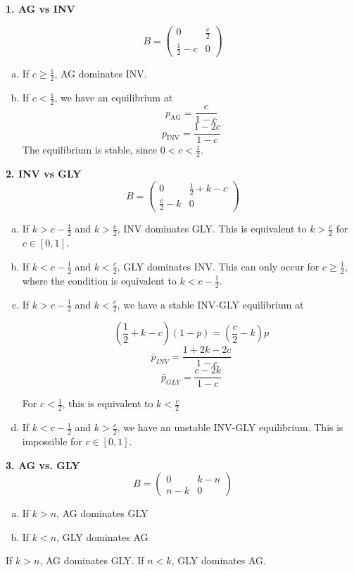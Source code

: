 \documentclass[12pt]{report}
\begin{document}
\textbf{1. AG vs INV} 

$$B = \begin{pmatrix}
0 & \frac{c}{2}\\
\frac{1}{2} - c & 0 
\end{pmatrix} $$

\begin{enumerate}[(a)]
\item If  $c \ge \frac{1}{2}$, AG dominates INV.
\item If $c < \frac{1}{2}$, we have an equilibrium at 
$$p_{\text{AG}} = \frac{c}{1-c}$$
$$p_{\text{INV}} = \frac{1 - 2c}{1-c}$$
The equilibrium is stable, since $0 < c < \frac{1}{2}$. 
\end{enumerate}

\textbf{2. INV vs GLY}
$$B = \begin{pmatrix}
0 & \frac{1}{2} + k - c\\
\frac{c}{2} - k & 0 
\end{pmatrix} $$
\begin{enumerate}[(a)]
\item If $k > c - \frac{1}{2}$ and $k > \frac{c}{2}$,  INV dominates GLY. This is equivalent to $k > \frac{c}{2}$ for $c \in [0,1]$. 
\item If $k < c - \frac{1}{2}$ and $k < \frac{c}{2}$,  GLY dominates INV. This can only occur for $c \ge \frac{1}{2}$, where the condition is equivalent to $k < c - \frac{1}{2}$. 
\item  If $k > c - \frac{1}{2}$ and $k < \frac{c}{2}$, we have a stable INV-GLY equilibrium at 

$$(\frac{1}{2} + k - c) (1 - p) = (\frac{c}{2} - k) p$$
$$\bar{p}_{INV} = \frac{1 + 2k - 2c}{1 - c}$$
$$\bar{p}_{GLY} = \frac{c - 2k}{1-c}$$

For $c < \frac{1}{2}$, this is equivalent to $k < \frac{c}{2}$

\item  If $k < c - \frac{1}{2}$ and $k > \frac{c}{2}$, we have an unstable INV-GLY equilibrium. This is impossible for $c \in [0,1]$. 
\end{enumerate}

 
 \textbf{3. AG vs. GLY}
$$B = \begin{pmatrix}
0 & k -n\\
n -k & 0 
\end{pmatrix} $$

\begin{enumerate}[(a)]
\item If $k > n$, AG dominates GLY
\item If $k < n$, GLY dominates AG
\end{enumerate}
If $k > n$, AG dominates GLY. If $n < k$, GLY dominates AG. 
\end{document}
